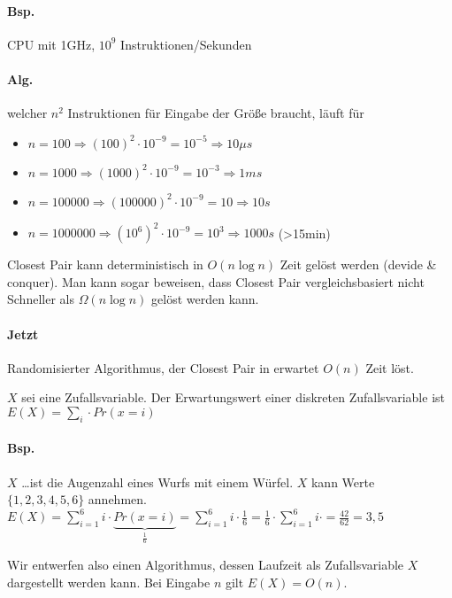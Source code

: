\paragraph*{Bsp.} CPU mit 1GHz, $10^9$ Instruktionen/Sekunden

\paragraph*{Alg.} welcher $n^2$ Instruktionen für Eingabe der Größe braucht, läuft für
\begin{itemize}
	\item[] $n=100 \Rightarrow (100)^2 \cdot 10^{-9} = 10^{-5} \Rightarrow 10\mu s$
	\item[] $n=1000 \Rightarrow (1000)^2 \cdot 10^{-9} = 10^{-3} \Rightarrow 1ms$
	\item[] $n=100000 \Rightarrow (100000)^2 \cdot 10^{-9} = 10 \Rightarrow 10s$
	\item[] $n=1000000 \Rightarrow (10^6)^2 \cdot 10^{-9} = 10^3 \Rightarrow 1000s$ (>15min)
\end{itemize}

\par\medskip
Closest Pair kann deterministisch in $O(n \log n)$ Zeit gelöst werden (devide \& conquer). Man kann sogar beweisen, dass Closest Pair vergleichsbasiert nicht Schneller als $\Omega(n \log n)$ gelöst werden kann.
\par\medskip

\paragraph*{Jetzt} Randomisierter Algorithmus, der Closest Pair in erwartet $O(n)$ Zeit löst.

\par\medskip
$X$ sei eine Zufallsvariable. Der Erwartungswert einer diskreten Zufallsvariable ist $E(X)=\sum\limits_i \cdot Pr(x=i)$
\par\medskip

\paragraph*{Bsp.} $X$ \dots ist die Augenzahl eines Wurfs mit einem Würfel. $X$ kann Werte $\{ 1,2,3,4,5,6 \}$ annehmen. $E(X) = \sum\limits_{i=1}^{6} i \cdot \underbrace{Pr(x=i)}_{\frac{1}{6}} = \sum\limits_{i=1}^{6} i \cdot \frac{1}{6} = \frac{1}{6} \cdot \sum\limits_{i=1}^{6} i \cdot = \frac{42}{62} = 3,5$

\par\medskip
Wir entwerfen also einen Algorithmus, dessen Laufzeit als Zufallsvariable $X$ dargestellt werden kann. Bei Eingabe $n$ gilt $E(X) = O(n)$.
\par\medskip

